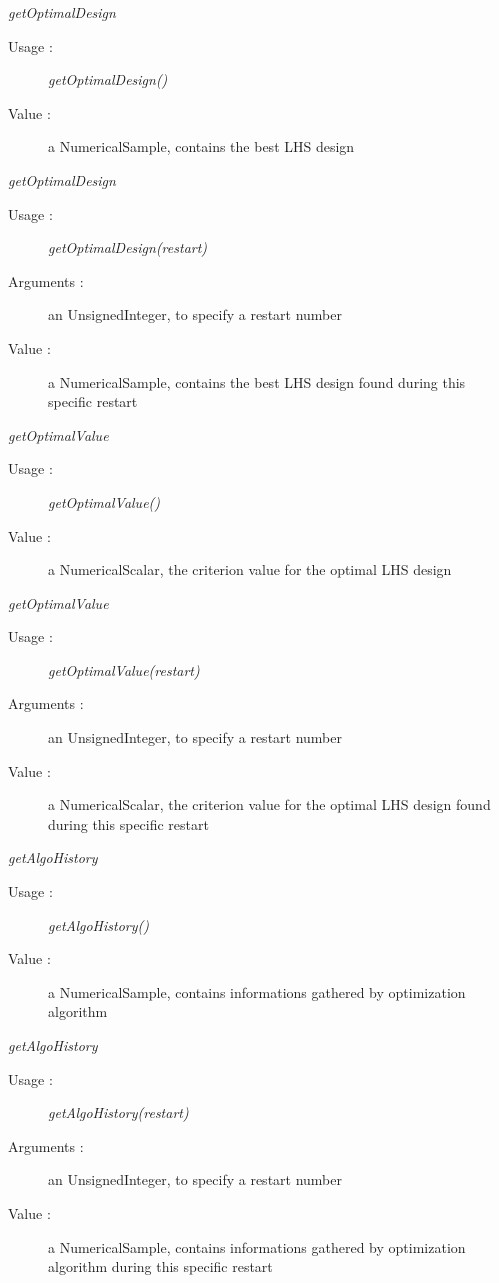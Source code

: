 \begin{description}
\item \textit{getOptimalDesign}
  \begin{description}
  \item[Usage :] \textit{getOptimalDesign()}
  \item[Value :] a NumericalSample, contains the best LHS design
  \end{description}

\item \textit{getOptimalDesign}
  \begin{description}
  \item[Usage :] \textit{getOptimalDesign(restart)}
  \item[Arguments :] an UnsignedInteger, to specify a restart number
  \item[Value :] a NumericalSample, contains the best LHS design found during this specific restart
  \end{description}

\item \textit{getOptimalValue}
  \begin{description}
  \item[Usage :] \textit{getOptimalValue()}
  \item[Value :] a NumericalScalar, the criterion value for the optimal LHS design
  \end{description}

\item \textit{getOptimalValue}
  \begin{description}
  \item[Usage :] \textit{getOptimalValue(restart)}
  \item[Arguments :] an UnsignedInteger, to specify a restart number
  \item[Value :] a NumericalScalar, the criterion value for the optimal LHS design found during this specific restart
  \end{description}

\item \textit{getAlgoHistory}
  \begin{description}
  \item[Usage :] \textit{getAlgoHistory()}
  \item[Value :] a NumericalSample, contains informations gathered by optimization algorithm
  \end{description}

\item \textit{getAlgoHistory}
  \begin{description}
  \item[Usage :] \textit{getAlgoHistory(restart)}
  \item[Arguments :] an UnsignedInteger, to specify a restart number
  \item[Value :] a NumericalSample, contains informations gathered by optimization algorithm during this specific restart
  \end{description}


\end{description}
